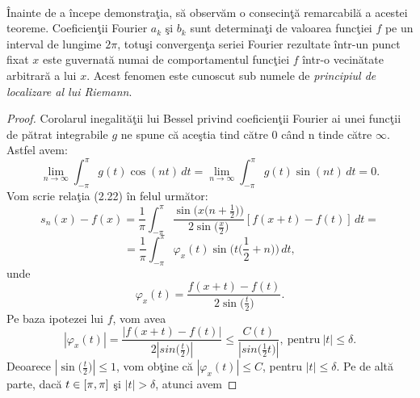 \documentclass[a4paper,openany,12pt]{report}
\begin{document}
\paragraph*{}\^ Inainte de a \^ incepe demonstra\c tia, s\u a observ\u am o consecin\c t\u a remarcabil\u a a acestei teoreme. Coeficien\c tii Fourier $a_k$ \c si $b_k$ sunt determina\c ti de valoarea func\c tiei $f$ pe un interval de lungime $2\pi$, totu\c si convergen\c ta seriei Fourier rezultate \^ intr-un punct fixat $x$ este guvernat\u a numai de comportamentul func\c tiei $f$ \^ intr-o vecin\u atate arbitrar\u a a lui $x$. Acest fenomen este cunoscut sub numele de \textit{principiul de localizare al lui Riemann}.
\begin{proof}
Corolarul inegalit\u a\c tii lui Bessel privind coeficien\c tii Fourier ai unei func\c tii de p\u atrat integrabile $g$ ne spune c\u a ace\c stia tind c\u atre 0 c\^ and n tinde c\u atre $\infty$. Astfel avem:
\begin{equation}
\lim_{n\to\infty}\int_{-\pi}^{\pi}g(t) \cos(nt)\, dt = \lim_{n\to\infty}\int_{-\pi}^{\pi}g(t) \sin(nt)\, dt = 0. 
\end{equation}
Vom scrie rela\c tia (2.22) \^ in felul urm\u ator:
\begin{equation*}
s_n(x) - f(x) = \frac{1}{\pi} \int_{-\pi}^{\pi}\frac{\sin\Big(x\big(n + \frac{1}{2}\big)\Big)}{2\sin\big(\frac{x}{2}\big)} [f(x+t)-f(t)]\,dt =
\end{equation*}
\begin{equation*}
= \frac{1}{\pi}\int_{-\pi}^{\pi}\varphi_x(t) \sin\Big(t\Big(\frac{1}{2}+n\Big)\Big)\, dt,
\end{equation*}
unde
\begin{equation*}
\varphi_x(t) = \frac{f(x+t)-f(t)}{2\sin\big(\frac{t}{2}\big)}.
\end{equation*}
Pe baza ipotezei lui $f$, vom avea
\begin{equation*}
\left| \varphi_x(t) \right| = \frac{\left| f(x+t)-f(t) \right|}{2\left|sin\big(\frac{t}{2}\big)\right|} \leq \frac{C(t)}{\left|sin\big(\frac{1}{2}t\big)\right|},\: \text{pentru} \: \left|t\right|\leq\delta.
\end{equation*}
Deoarece $\left|\sin\big(\frac{t}{2}\big)\right| \leq 1$, vom ob\c tine c\u a $\left| \varphi_x(t)\right| \leq C$, pentru $\left|t\right|\leq\delta$. Pe de alt\u a parte, dac\u a $t \in[\-\pi, \pi]$ \c si $\left|t\right|>\delta$, atunci avem

\end{proof}
\end{document}
